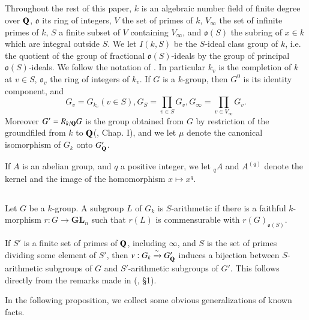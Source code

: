 \subsection{}\label{art04-sec3.1}

Throughout the rest of this paper, $k$ is an algebraic number field of finite degree over $\mathbf{Q}$, $\mathfrak{o}$ its ring of integers, $V$ the set of primes of $k$, $V_{\infty}$ the set of infinite primes of $k$, $S$ a finite subset of $V$ containing $V_{\infty}$, and $\mathfrak{o}(S)$ the subring of $x\in k$ which are integral outside $S$. We let $I(k,S)$ be the $S$-ideal class group of $k$, i.e. the quotient of the group of fractional $\mathfrak{o}(S)$-ideals by the group of principal $\mathfrak{o}(S)$-ideals. We follow the notation of \cite{art04-key5}. In particular $k_{v}$ is the completion of $k$ at $v\in S$, $\mathfrak{o}_{v}$ the ring of integers of $k_{v}$. If $G$ is a $k$-group, then $G^{0}$ is its identity component, and 
$$
G_{v}=G_{k_{v}}(v\in S), G_{S}=\prod\limits_{v\in S}G_{v}, G_{\infty}=\prod\limits_{v\in V_{\infty}}G_{v}.
$$
Moreover $G'=R_{k/\mathbf{Q}}G$ is the group obtained from $G$ by restriction of the groundfiled from $k$ to $\mathbf{Q}$(\cite{art04-key31}, Chap. I), and we let $\mu$ denote the canonical isomorphism of $G_{k}$ onto $G'_{\mathbf{Q}}$.

If $A$ is an abelian group, and $q$ a positive integer, we let ${}_{q}A$ and $A^{(q)}$ denote the kernel and the image of the homomorphism $x\mapsto x^{q}$.

\subsection{}\label{art04-sec3.2}
Let $G$ be a $k$-group. A subgroup $L$ of $G_{k}$ is $S$-arithmetic if there is a faithful $k$-morphism $r:G\to \mathbf{GL}_{n}$ such that $r(L)$ is commensurable with $r(G)_{\mathfrak{o}(S)}$.

If $S'$ is a finite set of primes of $\mathbf{Q}$, including $\infty$, and $S$ is the set of primes dividing some element of $S'$, then $v:G_{k}\xrightarrow{\sim}G'_{\mathbf{Q}}$ induces a bijection between $S$-arithmetic subgroups of $G$ and $S'$-arithmetic subgroups of $G'$. This follows directly from the remarks made in (\cite{art04-key5}, \S1).

In the following proposition, we collect some obvious generalizations of known facts.

